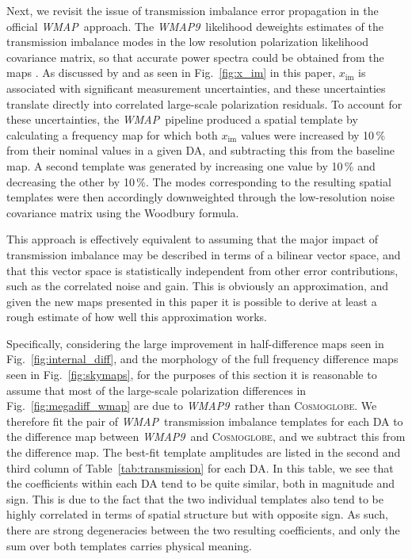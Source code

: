 \documentclass[twocolumn]{../../common/aa}
\def\WMAP{\emph{WMAP}}
\def\WMAPnine{\emph{WMAP9}}
\newcommand{\cosmoglobe}{\textsc{Cosmoglobe}}
\begin{document}
Next, we revisit the issue of transmission imbalance error propagation in the official \WMAP\ approach. The \WMAPnine\ likelihood deweights estimates of the transmission imbalance modes in the low resolution polarization likelihood covariance matrix, so that accurate power spectra could be obtained from the maps \citep{jarosik2010}. As discussed by \citet{jarosik2007} and as  seen in Fig.~\ref{fig:x_im} in this paper, $x_{\mathrm{im}}$ is associated with significant measurement uncertainties, and these uncertainties translate directly into correlated large-scale polarization residuals. To account for these uncertainties, the \WMAP\ pipeline produced a spatial template by calculating a frequency map for which both $x_{\textrm{im}}$ values were increased by 10\,\% from their nominal values in a given DA, and subtracting this from the baseline map. A second template was generated by increasing one value by 10\,\% and decreasing the other by 10\,\%. The modes corresponding to the resulting spatial templates were then accordingly downweighted through the low-resolution noise covariance matrix using the Woodbury formula.

This approach is effectively equivalent to assuming that the major impact of transmission imbalance may be described in terms of a bilinear vector space, and that this vector space is statistically independent from other error contributions, such as the correlated noise and gain. This is obviously an approximation, and given the new maps presented in this paper it is possible to derive at least a rough estimate of how well this approximation works.

Specifically, considering the large improvement in half-difference maps seen in Fig.~\ref{fig:internal_diff}, and the morphology of the full frequency difference maps seen in Fig.~\ref{fig:skymaps}, for the purposes of this section it is reasonable to assume that most of the large-scale polarization differences in Fig.~\ref{fig:megadiff_wmap} are due to \WMAPnine\ rather than \cosmoglobe. We therefore fit the pair of \WMAP\ transmission imbalance templates for each DA to the difference map between \WMAPnine\ and \cosmoglobe, and we subtract this from the difference map. The best-fit template amplitudes are listed in the second and third column of Table~\ref{tab:transmission} for each DA. In this table, we see that the coefficients within each DA tend to be quite similar, both in magnitude and sign. This is due to the fact that the two individual templates also tend to be highly correlated in terms of spatial structure but with opposite sign. As such, there are strong degeneracies between the two resulting coefficients, and only the sum over both templates carries physical meaning. 
\end{document}
